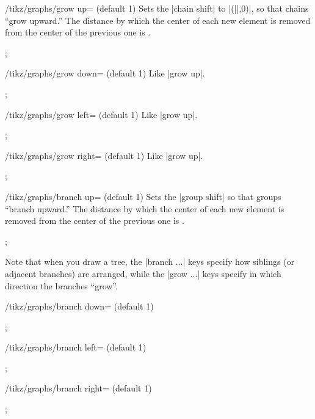 \begin{key}{/tikz/graphs/grow up= (default 1)}
  Sets the |chain shift| to |(||,0)|, so that chains
  ``grow upward.'' The distance by which the center of each new
  element is removed from the center of the previous one is
  . 
\begin{codeexample}[]
\tikz {};      
\end{codeexample}
\end{key}
\begin{key}{/tikz/graphs/grow down= (default 1)}
  Like |grow up|.
\begin{codeexample}[]
\tikz {};      
\end{codeexample}
\end{key}
\begin{key}{/tikz/graphs/grow left= (default 1)}
  Like |grow up|.
\begin{codeexample}[]
\tikz {};      
\end{codeexample}
\end{key}
\begin{key}{/tikz/graphs/grow right= (default 1)}
  Like |grow up|.
\begin{codeexample}[]
\tikz {};      
\end{codeexample}
\end{key}
\begin{key}{/tikz/graphs/branch up= (default 1)}
  Sets the |group shift| so that groups ``branch upward.''  The
  distance by which the center of each new element is removed from
  the center of the previous one is .
\begin{codeexample}[]
\tikz {};      
\end{codeexample}
  Note that when you draw a tree, the |branch ...| keys specify how
  siblings (or adjacent branches) are arranged, while the |grow ...|
  keys specify in which direction the branches ``grow''.
\end{key}
\begin{key}{/tikz/graphs/branch down= (default 1)}
\begin{codeexample}[]
\tikz {};      
\end{codeexample}
\end{key}
\begin{key}{/tikz/graphs/branch left= (default 1)}
\begin{codeexample}[]
\tikz {};      
\end{codeexample}
\end{key}
\begin{key}{/tikz/graphs/branch right= (default 1)}
\begin{codeexample}[]
\tikz {};      
\end{codeexample}
\end{key}

